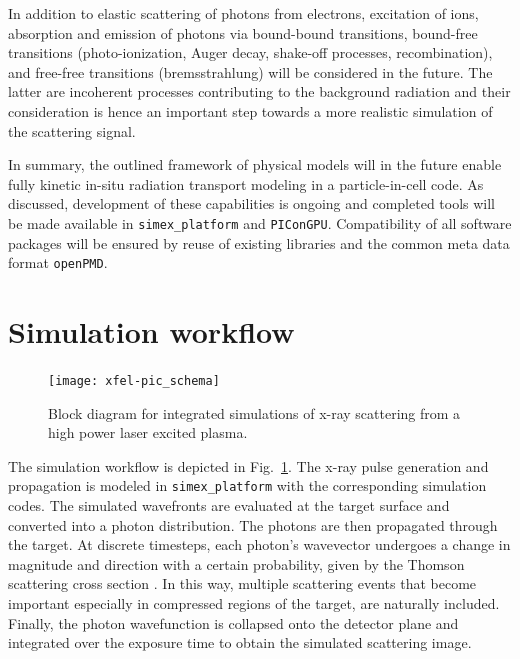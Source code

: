 \documentclass[12pt]{scrartcl}
\begin{document}
In addition to elastic scattering of photons from electrons,
excitation of ions, absorption and emission of photons via bound-bound
transitions,
bound-free transitions (photo-ionization, Auger decay, shake-off processes, recombination),
and free-free transitions (bremsstrahlung) will be considered in
the future. The latter are incoherent processes contributing to the background
radiation and their consideration is hence an important step towards a more
realistic simulation of the scattering signal.

In summary, the outlined
framework of physical models will in the future enable fully kinetic in-situ radiation
transport modeling in a particle-in-cell code.
As discussed, development of these capabilities is ongoing and completed tools
will be made available in \texttt{simex\_platform} and \texttt{PIConGPU}.
Compatibility of all software packages will be ensured by reuse of existing
libraries and the common meta data format \texttt{openPMD}.

\section{Simulation workflow}
%
\begin{figure}[ht]
  \begin{center}
    \texttt{[image: xfel-pic\_schema]}
  \end{center}
  \caption{Block diagram for integrated simulations of x-ray scattering from a high
  power laser excited plasma.}
  \label{fig:xfel-pic_schema}
\end{figure}

The simulation workflow is depicted in Fig.~\ref{fig:xfel-pic_schema}. The x-ray
pulse generation and propagation is modeled in \texttt{simex\_platform} with the
corresponding simulation codes. The simulated wavefronts are evaluated at the
target surface and converted into a photon distribution. The photons are then
propagated through the target. At discrete timesteps, each photon's wavevector
undergoes a change in magnitude and direction with a
certain probability, given by the Thomson scattering cross section
\cite{Jackson1975}. In this way, multiple scattering events that become
important especially in compressed regions of the target, are naturally
included. Finally, the photon wavefunction is collapsed onto the detector plane
and integrated over the exposure time to obtain the simulated scattering image.
%
%
\end{document}
